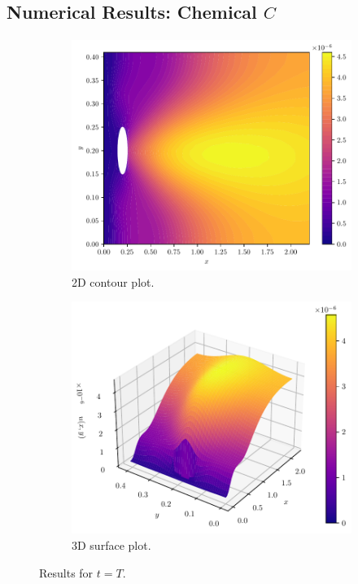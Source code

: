 \documentclass{beamer}
\theoremstyle{definition}
\theoremstyle{remark}
\theoremstyle{example}
\newif\ifinsection
\newif\ifinsubsection
\let\oldsubsection\subsection
\renewcommand{\subsection}{
  \global\insubsectiontrue
  \oldsubsection}
\newcommand {\aframe}[1] {
  \begin{frame}
    \ifinsection\frametitle{\secname}\fi
    \ifinsubsection\framesubtitle{\subsecname}\fi
  #1
  \end{frame}
}
\begin{document}
\subsection{Numerical Results: Chemical $C$}
\aframe{
  \begin{figure}
    \begin{subfigure}[b]{0.45\textwidth}
      \centering \includegraphics[width=\textwidth]{figs/c-chemical-2d.pdf}
      \caption{2D contour plot.}
    \end{subfigure}
    \begin{subfigure}[b]{0.53\textwidth}
      \centering \includegraphics[width=\textwidth]{figs/c-chemical-3d.pdf}
      \caption{3D surface plot.}
    \end{subfigure}
    \caption{Results for $t=T$.}
  \end{figure}
}
\end{document}
